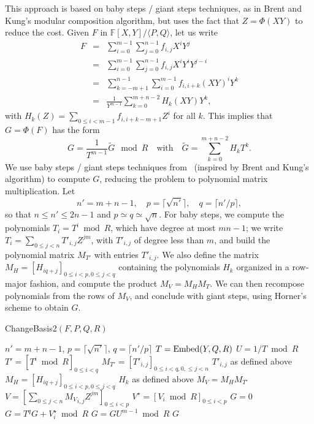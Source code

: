 \documentclass[12pt]{article}
\def\F {\ensuremath{\mathbb{F}}}
\begin{document}
This approach is based on baby steps / giant steps techniques, as in
Brent and Kung's modular composition algorithm, but uses the fact that
$Z=\Phi(XY)$ to reduce the cost. Given $F$ in $\F[X,Y]/\langle
P,Q\rangle$, let us write
\begin{eqnarray*}
F&=&\sum_{i=0}^{m-1}\sum_{j=0}^{n-1} f_{i,j}X^i Y^j\\
&=&\sum_{i=0}^{m-1}\sum_{j=0}^{n-1} f_{i,j}X^i Y^i Y^{j-i}\\
&=&\sum_{k=-m+1}^{n-1}\sum_{i=0}^{m-1} f_{i,i+k}(XY)^i Y^k\\
&=&\frac{1}{Y^{m-1}} \sum_{k=0}^{m+n-2} H_k(XY) Y^k,
\end{eqnarray*}
with $H_k(Z)=\sum_{0 \le i < m-1} f_{i,i+k-m+1} Z^i$ for all $k$.
This implies that $G=\Phi(F)$ has the form
$$G = \frac{1}{T^{m-1}}\widetilde{G} \mod R\quad\text{with}\quad
\widetilde{G}=\sum_{k=0}^{m+n-2} H_k T^k.$$ We use baby steps / giant
steps techniques from~\cite{LeMeSc13} (inspired by Brent and Kung's
algorithm) to compute $G$, reducing the problem to polynomial matrix
multiplication. Let
$$n'=m+n-1,\quad p=\lceil \sqrt {n'} \rceil,\quad q=\lceil
n'/p\rceil,$$ so that $n \le n' \le 2n-1$ and $p\simeq q \simeq
\sqrt{n}$.  For baby steps, we compute the polynomials $T_i=T^i \bmod
R$, which have degree at most $mn-1$; we write $T_i = \sum_{0 \le j <
  n} T'_{i,j} Z^{jm}$, with $T'_{i,j}$ of degree less than $m$, and
build the polynomial matrix $M_{T'}$ with entries $T'_{i,j}$.  We also
define the matrix $M_H=[H_{iq+j}]_{0 \le i <p, 0 \le j < q}$
containing the polynomials $H_k$ organized in a row-major fashion, and
compute the product $M_V=M_H M_T$. We can then recompose polynomials
from the rows of $M_V$, and conclude with giant steps, using Horner's
scheme to obtain $G$.
\begin{algorithm}[H]
  \caption{ChangeBasis2$(F,P,Q,R)$}
  \begin{algorithmic}[1]
    \STATE $n'=m+n-1$, $p=\lceil \sqrt {n'} \rceil$, $q=\lceil n'/p\rceil$
    \STATE\label{iso2:2} $T={\rm Embed}(Y,Q,R)$
    \STATE\label{iso2:3} $U=1/T \bmod R$
    \STATE\label{iso2:4} $T'=[T^i \bmod R]_{0 \le i < q}$
    \STATE $M_{T'}=[T'_{i,j}]_{0\le i < q, 0, \le j < n}$ \hfill $T'_{i,j}$ as defined above
    \STATE $M_H=[H_{iq+j}]_{0 \le i <p, 0 \le j < q}$ \hfill $H_k$ as defined above
    \STATE\label{iso2:7} $M_V = M_H M_{T'}$
    \STATE $V=[\sum_{0 \le j <n} {M_V}_{i,j} Z^{jm} ]_{0 \le i <p}$
    \STATE $V^\star=[V_i \bmod R]_{0 \le i <p}$
    \STATE $G=0$
    \label{iso2:11}
    \STATE $G=T^qG+V^\star_i \bmod R$
    \ENDFOR
    \STATE\label{iso2:14} $G=G U^{m-1} \bmod R$
    \RETURN $G$
  \end{algorithmic}
  \label{algo:iso2}
\end{algorithm}
\end{document}
